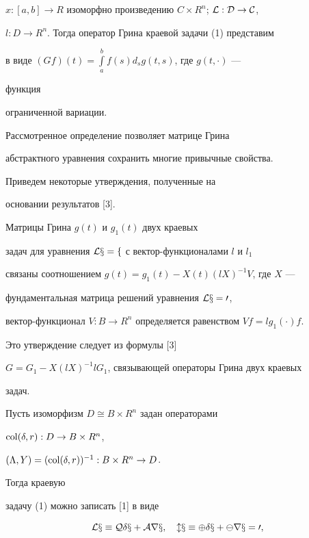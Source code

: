 $x:[a,b]\to R$ изоморфно произведению $C\times R^n$; $\cal L:D\to C$, 


$l:D\to R^n$. Тогда оператор Грина краевой задачи (1) представим  


в виде $(G f)(t)=\int\limits^b_a f(s)d_s g(t,s)$, где $g(t,\cdot)$ --- 


функция 


ограниченной вариации. 


 


Рассмотренное определение позволяет матрице Грина  


абстрактного уравнения сохранить многие привычные свойства.  


Приведем некоторые утверждения, полученные на  


основании результатов [3]. 


 


\begin{thm} 


Матрицы Грина $g(t)$ и $g_1(t)$ двух краевых  


задач для уравнения $\cal L x=f$ с вектор-функционалами $l$ и $l_1$ 


связаны соотношением $g(t)=g_1(t)-X(t)(l X)^{-1}V$, где $X$ --- 


фундаментальная матрица решений уравнения $\cal L x=0$,  


вектор-функционал $V:B\to R^n$ определяется равенством $V f=l 


g_1(\cdot)f$. 


\end{thm} 


 


Это утверждение следует из формулы [3] 


$G=G_1-X(l X)^{-1}l G_1$, связывающей операторы Грина двух краевых  


задач. 


 


Пусть изоморфизм $D\cong B\times R^n$ задан операторами 


$\operatorname{col}(\delta,r):D\to B\times R^n$, 


$(\Lambda,Y)=(\operatorname{col}(\delta,r))^{-1}:B\times R^n\to D$. 


Тогда краевую  


задачу (1) можно записать [1] в виде  


\begin{equation} 


\cal L x\equiv Q\delta x+A r x,\quad l x\equiv\Phi\delta x+\Psi r x=0, 


\end{equation} 



